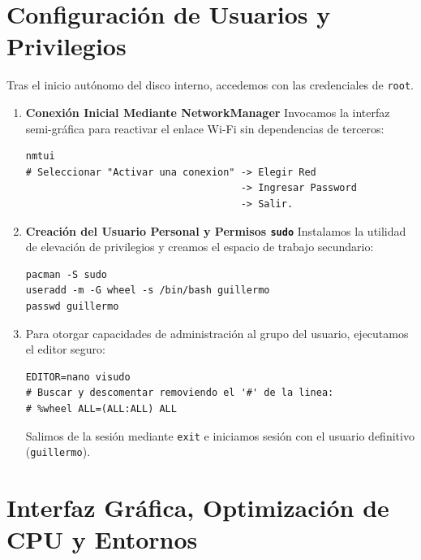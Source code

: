 \section{Configuración de Usuarios y Privilegios}
Tras el inicio autónomo del disco interno, accedemos con las credenciales de \texttt{root}.

\begin{enumerate}
\item [$\bullet$] \textbf{Conexión Inicial Mediante NetworkManager}
Invocamos la interfaz semi-gráfica para reactivar el enlace Wi-Fi sin dependencias de terceros:
\begin{lstlisting}
nmtui
# Seleccionar "Activar una conexion" -> Elegir Red
                                     -> Ingresar Password 
                                     -> Salir.
\end{lstlisting}

\item [$\bullet$] \textbf{Creación del Usuario Personal y Permisos \texttt{sudo}}
Instalamos la utilidad de elevación de privilegios y creamos el espacio de trabajo secundario:
\begin{lstlisting}
pacman -S sudo
useradd -m -G wheel -s /bin/bash guillermo
passwd guillermo
\end{lstlisting}

\item [$\bullet$] Para otorgar capacidades de administración al grupo del usuario, ejecutamos el editor seguro:
\begin{lstlisting}
EDITOR=nano visudo
# Buscar y descomentar removiendo el '#' de la linea:
# %wheel ALL=(ALL:ALL) ALL
\end{lstlisting}
Salimos de la sesión mediante \texttt{exit} e iniciamos sesión con el usuario definitivo (\texttt{guillermo}).
\end{enumerate}

\section{Interfaz Gráfica, Optimización de CPU y Entornos}

